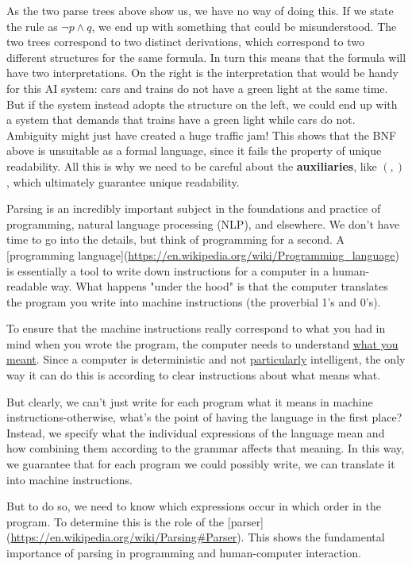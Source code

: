 \documentclass[11pt]{article}
\begin{document}
As the two parse trees above show us, we have no way of doing this. If we state the rule as \(\neg p \land q\), we end up with something that could be misunderstood. The two trees correspond to two distinct derivations, which correspond to two different structures for the same formula. In turn this means that the formula will have two interpretations. On the right is the interpretation that would be handy for this AI system: cars and trains do not have a green light at the same time. But if the system instead adopts the structure on the left, we could end up with a system that demands that trains have a green light while cars do not. Ambiguity might just have created a huge traffic jam! This shows that the BNF above is unsuitable as a formal language, since it fails the property of unique readability.
All this is why we need to be careful about the \textbf{\textbf{auxiliaries}}, like \((,)\), which
ultimately guarantee unique readability. 

Parsing is an incredibly important subject in the foundations and practice of
programming, natural language processing (NLP), and elsewhere. We don't have
time to go into the details, but think of programming for a second. A
[programming language](\url{https://en.wikipedia.org/wiki/Programming\_language}) is
essentially a tool to write down instructions for a computer in a human-readable
way. What happens "under the hood" is that the computer translates the program
you write into machine instructions (the proverbial 1's and 0's). 

To ensure that the machine instructions really correspond to what you had in
mind when you wrote the program, the computer needs to understand \uline{what you
meant}. Since a computer is deterministic and not \uline{particularly} intelligent,
the only way it can do this is according to clear instructions about what means
what. 

But clearly, we can't just write for each program what it means in machine
instructions-otherwise, what's the point of having the language in the first
place? Instead, we specify what the individual expressions of the language mean
and how combining them according to the grammar affects that meaning. In this
way, we guarantee that for each program we could possibly write, we can
translate it into machine instructions. 

But to do so, we need to know which expressions occur in which order in the
program. To determine this is the role of the
[parser](\url{https://en.wikipedia.org/wiki/Parsing\#Parser}). This shows the
fundamental importance of parsing in programming and human-computer interaction.
\end{document}

